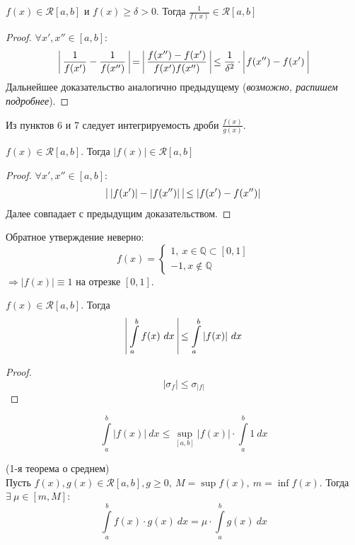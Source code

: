 \begin{numtheorem}
    $f(x) \in \mathcal{R}[a, b]$ и $f(x) \geq \delta > 0$. Тогда $\frac{1}{f(x)} \in \mathcal{R}[a, b]$
\end{numtheorem}
\begin{proof}
    $\forall x', x'' \in [a, b]$:
    \begin{align*}
        \vline\ \frac{1}{f(x')} - \frac{1}{f(x'')}\ \vline =\ \vline \frac{f(x'') - f(x')}{f(x')f(x'')}\ \vline \leq \frac{1}{\delta^2}\cdot\ \vline f(x'')-f(x')\ \vline
    \end{align*}
    Дальнейшее доказательство аналогично предыдущему (\textit{возможно, распишем подробнее}).
\end{proof}
\begin{consequense}
    Из пунктов 6 и 7 следует интегрируемость дроби $\frac{f(x)}{g(x)}$.
\end{consequense}
\begin{numtheorem}
    $f(x) \in \mathcal{R}[a, b]$. Тогда $|f(x)| \in \mathcal{R}[a, b]$
\end{numtheorem}
\begin{proof}
    $\forall x', x'' \in [a, b]$:
    \begin{align*}
        \vline\ |f(x')| - |f(x'')|\ \vline \leq |f(x')-f(x'')|
    \end{align*}
    Далее совпадает с предыдущим доказательством.
\end{proof}
\begin{comm}
    Обратное утверждение неверно:
    \[f(x) = \begin{cases}
        1, \ x\in\mathbb{Q}\subset [0, 1]\\
        -1, x\notin\mathbb{Q}
    \end{cases}\]
    $\Rightarrow |f(x)| \equiv 1$ на отрезке $[0, 1]$.
\end{comm}
\begin{numtheorem}
    $f(x) \in \mathcal{R}[a, b]$. Тогда 
    \[\vline\ \int\limits_{a}^{b}f(x)\ dx\ \vline\leq \int\limits_{a}^{b} |f(x)|\ dx\]
\end{numtheorem}
\begin{proof}
    \[|\sigma_f| \leq \sigma_{|f|}\]
\end{proof}
\begin{comm}
    \[\int\limits_{a}^{b}|f(x)|\ dx \leq \sup \limits_{[a, b]} |f(x)|\cdot\int\limits_{a}^{b}1\ dx\]
\end{comm}
\setcounter{thmcount}{0}
\begin{theorem} (1-я теорема о среднем)\\
    Пусть $f(x), g(x) \in \mathcal{R}[a, b], g \geq 0,\ M = \sup f(x),\ m = \inf f(x)$. Тогда\\
    $\exists\ \mu\in [m,M]$:
    \[\int\limits_{a}^{b}f(x)\cdot g(x)\ dx = \mu\cdot\int\limits_{a}^{b}g(x)\ dx\]
\end{theorem}
